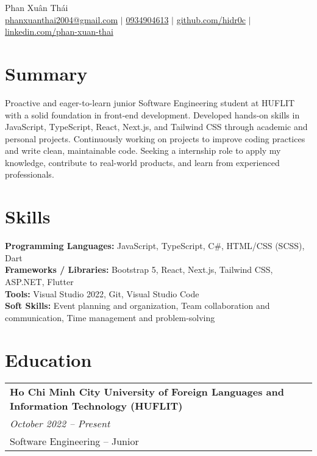 \documentclass[a4paper,11pt]{article}
\begin{document}
\pagestyle{empty}

\begin{center}
\LARGE{Phan Xuân Thái} \\[5pt]
\small{\href{mailto:phanxuanthai2004@gmail.com}{phanxuanthai2004@gmail.com} $|$ 
\href{tel:0934904613}{0934904613} $|$ 
\href{https://github.com/hidr0c}{github.com/hidr0c} $|$ 
\href{https://www.linkedin.com/in/xuân-thái-phan-bab693352/}{linkedin.com/phan-xuan-thai} 
} \\[2pt]
\end{center}
\vspace{1.5em}

\section{Summary}
\begin{spacing}{1.05}
Proactive and eager-to-learn junior Software Engineering student at HUFLIT with a solid foundation in front-end development. Developed hands-on skills in JavaScript, TypeScript, React, Next.js, and Tailwind CSS through academic and personal projects. Continuously working on projects to improve coding practices and write clean, maintainable code. Seeking a internship role to apply my knowledge, contribute to real-world products, and learn from experienced professionals.
\end{spacing}

\section{Skills}
\begin{spacing}{1.05}
\textbf{Programming Languages:} JavaScript, TypeScript, C\#, HTML/CSS (SCSS), Dart \\
\textbf{Frameworks / Libraries:} Bootstrap 5, React, Next.js, Tailwind CSS, ASP.NET, Flutter \\
\textbf{Tools:} Visual Studio 2022, Git, Visual Studio Code \\
\textbf{Soft Skills:} Event planning and organization, Team collaboration and communication, Time management and problem-solving 
\end{spacing}

\section{Education}
\begin{spacing}{1.05}
\begin{tabularx}{\linewidth}{@{}l@{}}
\textbf{Ho Chi Minh City University of Foreign Languages and Information Technology (HUFLIT)} \\
\normalsize\textit{October 2022 -- Present} \\
Software Engineering -- Junior
\end{tabularx}
\end{spacing}
\end{document}

